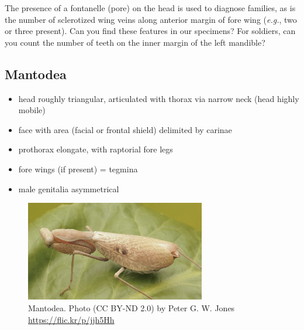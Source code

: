 \documentclass[letterpaper, 11pt]{article}
\begin{document}
\noindent{}The presence of a fontanelle (pore) on the head is used to diagnose families, as is the number of sclerotized wing veins along anterior margin of fore wing (\textit{e.g.}, two or three present). Can you find these features in our specimens? For soldiers, can you count the number of teeth on the inner margin of the left mandible?

\subsection{Mantodea}
\begin{itemize}
\item head roughly triangular, articulated with thorax via narrow neck (head highly mobile)
\item face with area (facial or frontal shield) delimited by carinae
\item prothorax elongate, with raptorial fore legs
\item fore wings (if present) = tegmina
\item male genitalia asymmetrical
\end{itemize}

\begin{figure}[ht!]
  \centering
    \includegraphics[width=0.7\textwidth]{mantid1}
  \caption{Mantodea. Photo (CC BY-ND 2.0) by Peter G. W. Jones \url{https://flic.kr/p/jjh5Hh}}
  \label{fig:mantidbody}
\end{figure}
\end{document}

